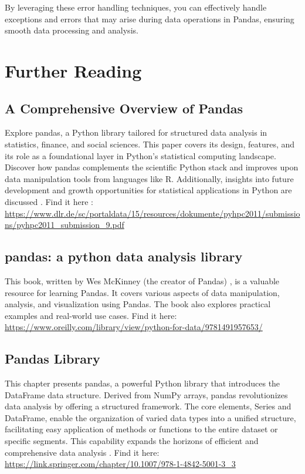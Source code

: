By leveraging these error handling techniques, you can effectively handle exceptions and errors that may arise during data operations in Pandas, ensuring smooth data processing and analysis.


\section{Further Reading}

\subsection{A Comprehensive Overview of Pandas}

Explore pandas, a Python library tailored for structured data analysis in statistics, finance, and social sciences. This paper covers its design, features, and its role as a foundational layer in Python's statistical computing landscape. Discover how pandas complements the scientific Python stack and improves upon data manipulation tools from languages like R. Additionally, insights into future development and growth opportunities for statistical applications in Python are discussed \cite{McKinney:2011}. Find it here : \url{https://www.dlr.de/sc/portaldata/15/resources/dokumente/pyhpc2011/submissions/pyhpc2011_submission_9.pdf}

\subsection{pandas: a python data analysis library}

This book, written by Wes McKinney (the creator of Pandas) \cite{McKinney:2015}, is a valuable resource for learning Pandas. It covers various aspects of data manipulation, analysis, and visualization using Pandas. The book also explores practical examples and real-world use cases. 
Find it here: \ul{https://www.oreilly.com/library/view/python-for-data/9781491957653/}

\subsection{Pandas Library}

This chapter presents pandas, a powerful Python library that introduces the DataFrame data structure. Derived from NumPy arrays, pandas revolutionizes data analysis by offering a structured framework. The core elements, Series and DataFrame, enable the organization of varied data types into a unified structure, facilitating easy application of methods or functions to the entire dataset or specific segments. This capability expands the horizons of efficient and comprehensive data analysis \cite{Betancourt:2019}. 
Find it here: \url{https://link.springer.com/chapter/10.1007/978-1-4842-5001-3_3}

